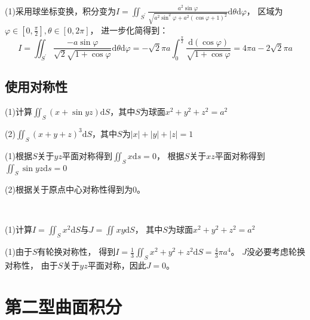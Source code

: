 \begin{solution}
  (1)采用球坐标变换，积分变为$I = \iint_{S^{\prime}} \frac{a^2 \sin \varphi}{\sqrt{a^2 \sin^2 \varphi + a^2( \cos \varphi + 1)^2}}\mathrm{d} \theta \mathrm{d} \varphi$，
  区域为$\varphi \in [0, \frac{\pi}{2}], \theta \in [0,2\pi]$，
  进一步化简得到：
  \begin{equation*}
    I = \iint_{S^{\prime}}\frac{-a \sin \varphi }{\sqrt{2} \sqrt{1 + \cos \varphi}}\mathrm{d} \theta \mathrm{d} \varphi = - \sqrt{2}\pi a \int_0^{\frac{\pi}{2}} \frac{\mathrm{d}(\cos \varphi)}{\sqrt{1 + \cos \varphi}} = 4\pi a - 2 \sqrt{2} \pi a
  \end{equation*}
\end{solution}

\subsection{使用对称性}

\begin{exercise}[积分曲面对称]
  (1)计算$\iint_S(x + \sin yz)\mathrm{d} S$，其中$S$为球面$x^2 + y^2 + z^2 = a^2$

  (2)$\iint_S (x+y+z)^3 \mathrm{d} S$，其中$S$为$|x| + |y| + |z| = 1$
\end{exercise}

\begin{solution}
  (1)根据$S$关于$yz$平面对称得到$\iint_S x\mathrm{d} s = 0$，
  根据$S$关于$xz$平面对称得到$\iint _S \sin yz \mathrm{d} s = 0$

  (2)根据关于原点中心对称性得到为$0$。
\end{solution}

~

\begin{exercise}[轮换对称性]
  (1)计算$I = \iint_S x^2 \mathrm{d} S$与$J = \iint xy \mathrm{d} S$，
  其中$S$为球面$x^2 + y^2 + z^2 = a^2$
\end{exercise}

\begin{solution}
  (1)由于$S$有轮换对称性，
  得到$I = \frac{1}{3} \iint_S x^2 + y^2 + z^2 \mathrm{d} S = \frac{4}{3}\pi a^4$。
  $J$没必要考虑轮换对称性，
  由于$S$关于$yz$平面对称，因此$J = 0$。
\end{solution}




\section{第二型曲面积分}

